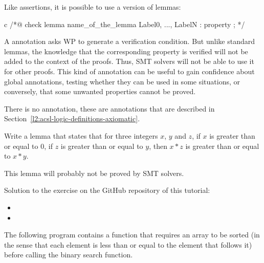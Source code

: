 Like assertions, it is possible to use a  version of lemmas:


\begin{CodeBlock}{c}
/*@
  check lemma name_of_the_lemma { Label0, ..., LabelN }:
    property ;
*/
\end{CodeBlock}


A  annotation asks WP to generate a verification
condition. But unlike standard lemmas, the knowledge that the
corresponding property is verified will not be added to the context of the
proofs. Thus, SMT solvers will not be able to use it for other proofs. This
kind of annotation can be useful to gain confidence about global annotations,
testing whether they can be used in some situations, or conversely, that
some unwanted properties cannot be proved.


There is no  annotation, these are 
annotations that are described in
Section~\ref{l2:acsl-logic-definitions-axiomatic}.








Write a lemma that states that for three integers $x$, $y$ and $z$, if $x$ is
greater than or equal to $0$, if $z$ is greater than or equal to $y$, then
$x * z$ is greater than or equal to $x * y$.


This lemma will probably not be proved by SMT solvers.


\begin{Information}
  Solution to the exercise on the GitHub repository of this tutorial:
  \begin{itemize}
    \item {}
    \item {}
  \end{itemize}
\end{Information}



\label{l4:acsl-properties-lemmas-lsorted-gsorted}


The following program contains a function that requires an array to be sorted
(in the sense that each element is less than or equal to the element that
follows it) before calling the binary search function.


